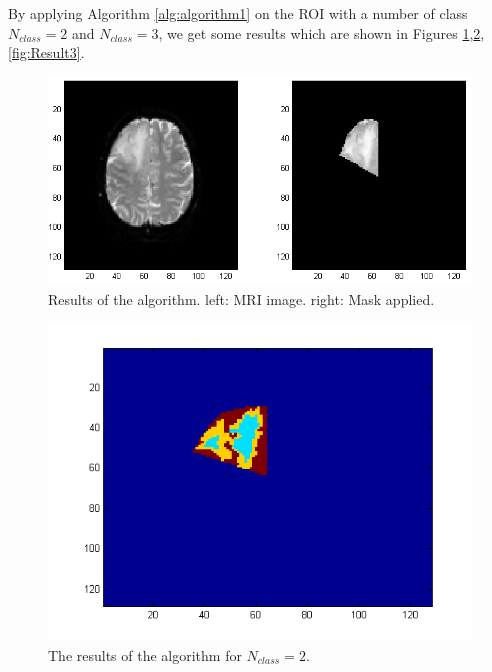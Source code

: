 By applying Algorithm \ref{alg:algorithm1} on the ROI with a number of class $N_{class} = 2$ and $N_{class} = 3$, we get some results which are shown in Figures \ref{fig:Result},\ref{fig:Result2},\ref{fig:Result3}.

\begin{figure}
\centering
    \includegraphics[scale=0.45,angle=0]{Result.png}
    \caption{Results of the algorithm. left: MRI image. right: Mask applied.}
    \label{fig:Result}
\end{figure}

\begin{figure}
\centering
    \includegraphics[scale=0.5,angle=0]{3class.png}
    \caption{The results of the algorithm for $N_{class} = 2$.}
    \label{fig:Result2}
\end{figure}


